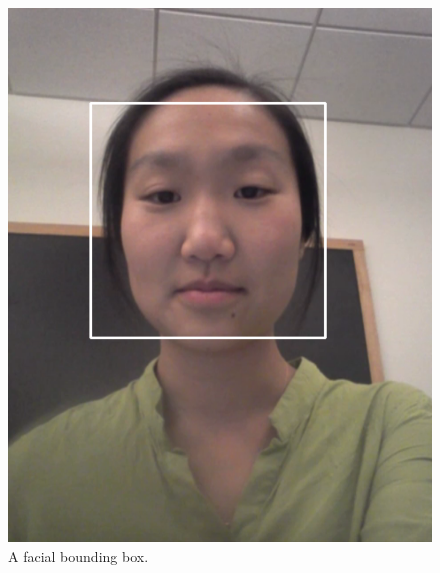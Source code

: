 \documentclass[10pt,twocolumn,letterpaper]{article}
\begin{document}
\begin{figure}
\begin{center}
	\includegraphics[scale=0.3]{figures/jane_bb}
\end{center}
\caption{A facial bounding box.}
\label{face_bb}
\end{figure}
\end{document}
